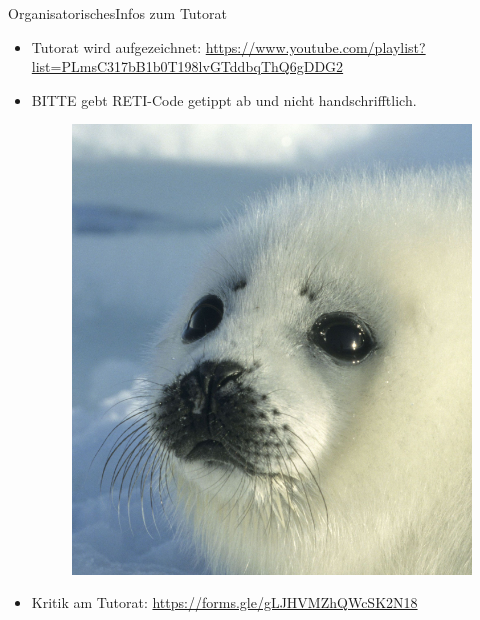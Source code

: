 \begin{frame}{Organisatorisches}{Infos zum Tutorat}
  \begin{itemize}
    \item \alert{Tutorat wird aufgezeichnet:} \url{https://www.youtube.com/playlist?list=PLmsC317bB1b0T198lvGTddbqThQ6gDDG2}
    \item \alert{\LARGE \uppercase{Bitte}} gebt RETI-Code \alert{getippt} ab und nicht handschrifftlich.
    \begin{figure}
      \centering
      \includegraphics[height=0.3\paperheight]{./figures/babyrobe.png}
    \end{figure}
    \item \alert{Kritik} am Tutorat: \url{https://forms.gle/gLJHVMZhQWcSK2N18}
  \end{itemize}
\end{frame}

